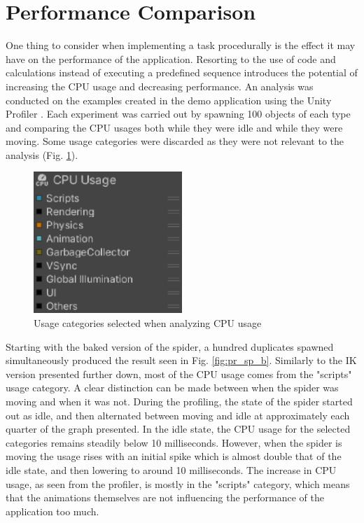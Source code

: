 \section{Performance Comparison}
One thing to consider when implementing a task procedurally is the
effect it may have on the performance of the application. Resorting to the use
of code and calculations instead of executing a predefined sequence introduces
the potential of increasing the CPU usage and decreasing performance. An
analysis was conducted on the examples created in the demo application using the
Unity Profiler \cite{unity_profiler}. Each experiment was carried out by
spawning 100 objects of each type and comparing the CPU usages both while they
were idle and while they were moving. Some usage categories were discarded as
they were not relevant to the analysis (Fig. \ref{fig:profiler_settings}).

\begin{figure}[h!]
    \centering
    \captionsetup{justification=centering}
    \includegraphics[width=0.5\textwidth]{grafika/profiler_settings.eps}
    \caption{Usage categories selected when analyzing CPU usage}
    \label{fig:profiler_settings}
\end{figure}

Starting with the baked version of the spider, a hundred duplicates spawned
simultaneously produced the result seen in Fig. \ref{fig:pr_sp_b}. Similarly
to the IK version presented further down, most of the CPU usage comes from the
"scripts" usage category. A clear distinction can be made between when the
spider was moving and when it was not. During the profiling, the state of the
spider started out as idle, and then alternated between moving and idle at
approximately each quarter of the graph presented. In the idle state, the CPU
usage for the selected categories remains steadily below 10 milliseconds.
However, when the spider is moving the usage rises with an initial spike which
is almost double that of the idle state, and then lowering to around 10
milliseconds. The increase in CPU usage, as seen from the profiler, is mostly in
the "scripts" category, which means that the animations themselves are not
influencing the performance of the application too much.

